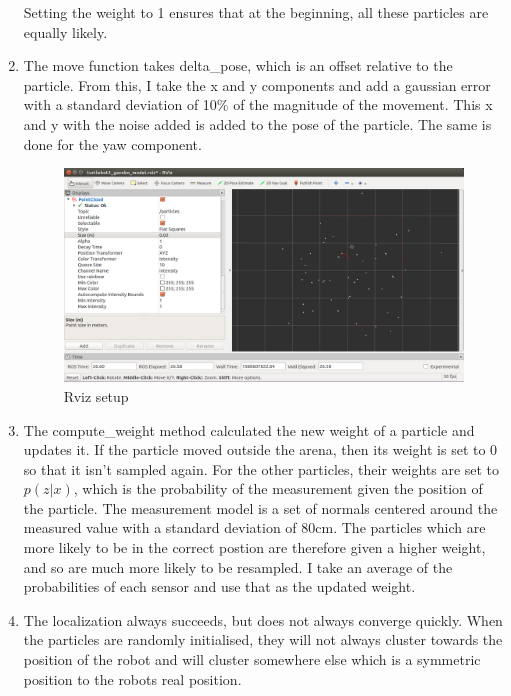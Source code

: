 \documentclass[12pt,a4paper]{article}
\begin{document}
\begin{enumerate}[label=(\alph*)]
	Setting the weight to 1 ensures that at the beginning, all these particles are equally likely.

	\item The move function takes delta\_pose, which is an offset relative to the particle. From this, I take the x and y components and add a gaussian error with a standard deviation of 10\% of the magnitude of the movement. This x and y with the noise added is added to the pose of the particle. The same is done for the yaw component.

	\begin{figure}[h]
		\centering
		\includegraphics[width=\textwidth]{fig/3c.png}
		\caption{Rviz setup}
		\label{fig:rviz}
	\end{figure}

	\item The compute\_weight method calculated the new weight of a particle and updates it. If the particle moved outside the arena, then its weight is set to 0 so that it isn't sampled again. For the other particles, their weights are set to $ p(z|x) $, which is the probability of the measurement given the position of the particle. The measurement model is a set of normals centered around the measured value with a standard deviation of 80cm. The particles which are more likely to be in the correct postion are therefore given a higher weight, and so are much more likely to be resampled. I take an average of the probabilities of each sensor and use that as the updated weight.

	\item The localization always succeeds, but does not always converge quickly. When the particles are randomly initialised, they will not always cluster towards the position of the robot and will cluster somewhere else which is a symmetric position to the robots real position.


\end{enumerate}
\end{document}
